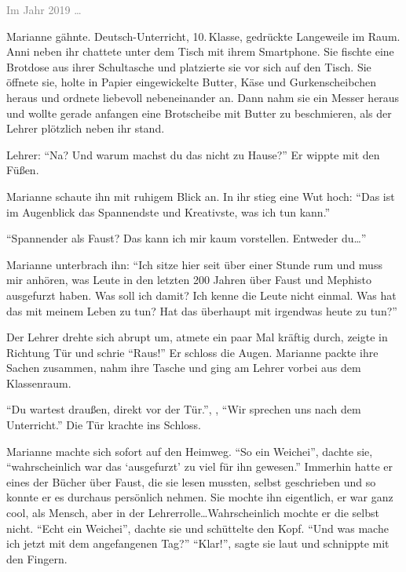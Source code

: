 \label{cha:2019_marianne}

\textcolor{gray}{Im Jahr 2019 \dots} %

Marianne gähnte. Deutsch-Unterricht, 10.\,Klasse, gedrückte Langeweile im Raum.
Anni neben ihr chattete unter dem Tisch mit ihrem Smartphone.
Sie fischte eine Brotdose aus ihrer Schultasche und platzierte sie vor sich auf den Tisch.
Sie öffnete sie, holte in Papier eingewickelte Butter, Käse und Gurkenscheibchen heraus und ordnete  liebevoll nebeneinander an.
Dann nahm sie ein Messer heraus und wollte gerade anfangen eine Brotscheibe mit Butter zu beschmieren, als der Lehrer plötzlich neben ihr stand.


Lehrer: \enquote{Na? Und warum machst du das nicht zu Hause?} Er wippte mit den Füßen.

Marianne schaute ihn mit ruhigem Blick an.
In ihr stieg eine Wut hoch: \enquote{Das ist im Augenblick das Spannendste und Kreativste, was ich tun kann.}

\enquote{Spannender als Faust? Das kann ich mir kaum vorstellen.
Entweder du\dots}

Marianne unterbrach ihn: \enquote{Ich sitze hier seit über einer Stunde rum und muss mir anhören, was Leute in den letzten 200 Jahren über Faust und Mephisto ausgefurzt haben.
Was soll ich damit?
Ich kenne die Leute nicht einmal.
Was hat das mit meinem Leben zu tun?
Hat das überhaupt mit irgendwas heute zu tun?}

Der Lehrer drehte sich abrupt um, atmete ein paar Mal kräftig durch, zeigte in Richtung Tür und schrie \enquote{Raus!}
Er schloss die Augen.
Marianne packte ihre Sachen zusammen, nahm ihre Tasche und ging am Lehrer vorbei aus dem Klassenraum.

\enquote{Du wartest draußen, direkt vor der Tür.}, , \enquote{Wir sprechen uns nach dem Unterricht.}
Die Tür krachte ins Schloss.

Marianne machte sich sofort auf den Heimweg.
\enquote{So ein Weichei}, dachte sie, \enquote{wahrscheinlich war das \enquote{ausgefurzt} zu viel für ihn gewesen.} Immerhin hatte er eines der Bücher über Faust, die sie lesen mussten, selbst geschrieben und so konnte er es durchaus persönlich nehmen.
Sie mochte ihn eigentlich, er war ganz cool, als Mensch, aber in der Lehrerrolle\dots Wahrscheinlich mochte er die selbst nicht.
\enquote{Echt ein Weichei}, dachte sie und schüttelte den Kopf.
\enquote{Und was mache ich jetzt mit dem angefangenen Tag?} \enquote{Klar!}, sagte sie laut und schnippte mit den Fingern.

